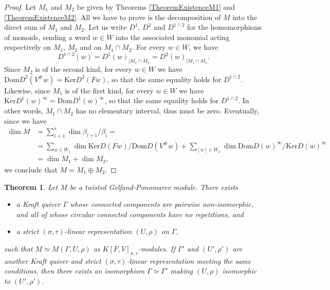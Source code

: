 \documentclass[12pt]{amsart}
\newtheorem{theorem}{Theorem}[section]
\theoremstyle{definition}
\newcommand{\<}{\langle}   %
\renewcommand{\>}{\rangle} %
\begin{document}
\begin{proof}
    Let $M_1$ and $M_2$ be given by Theorems \ref{TheoremExistenceM1} and \ref{TheoremExistenceM2}. All we have to prove is the decomposition of $M$ into the direct sum of $M_1$ and $M_2$. Let us write $D^{1}$, $D^2$ and $D^{1\cap 2}$ for the homomorphisms of monoids, sending a word $w \in W$ into the associated monomial acting respectively on $M_1$, $M_2$ and on $M_1\cap M_2$. For every $w \in W$, we have 
    \begin{equation*}
        D^{1\cap 2}(w) = D^1(w)_{|M_1\cap M_2} = D^2(w)_{|M_1\cap M_2}.
    \end{equation*} 
    Since $M_2$ is of the second kind, for every $w \in W$ we have $\mathrm{Dom}D^2(V^{\#}w) = \mathrm{Ker}D^2(Fw)$, so that the same equality holds for $D^{1\cap 2}$. Likewise, since $M_1$ is of the first kind, for every $w \in W$ we have $\mathrm{Ker}D^1(w)^{\infty} = \mathrm{Dom}D^1(w)^{\infty}$, so that the same equality holds for $D^{1\cap 2}$. In other words, $M_1\cap M_2$ has no elementary interval, thus must be zero. Eventually, since we have 
    \begin{align*}
        \dim M & = \sum_{i=1}^s \dim \beta_{i+1}/\beta_i = \\
        &= \sum_{w \in W_1} \dim \mathrm{Ker}D(Fw)/\mathrm{Dom}D(V^{\#}w) + \sum_{[w]\in W_2} \dim \mathrm{Dom}D(w)^{\infty}/\mathrm{Ker}D(w)^{\infty}\\
        & = \dim M_1 + \dim M_2,
    \end{align*}
    we conclude that $M = M_1 \oplus M_2$.
\end{proof}

\begin{theorem}\label{AllTwistedGFModulesComeFromKraftQuiver}
    Let $M$ be a twisted Gelfand-Ponomarev module. There exists 
    \begin{itemize}
        \item a Kraft quiver $\Gamma$ whose connected components are pairwise non-isomorphic, and all of whose circular connected components have no repetitions, and
        \item a strict $(\sigma,\tau)$-linear representation $(U,\rho)$ on $\Gamma$,
    \end{itemize}
    such that $M \simeq M(\Gamma,U,\rho)$ as $K[F,V]_{\sigma,\tau}$-modules. If $\Gamma'$ and $(U',\rho')$ are another Kraft quiver and strict $(\sigma,\tau)$-linear representation meeting the same conditions, then there exists an isomorphism $\Gamma \simeq \Gamma'$ making $(U,\rho)$ isomorphic to $(U',\rho')$.
\end{theorem}
\end{document}
